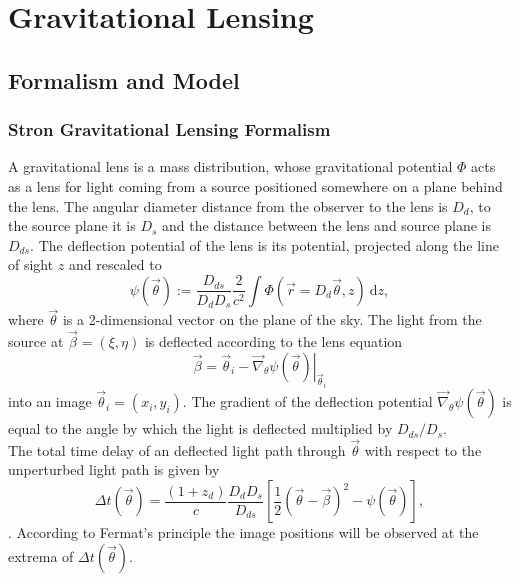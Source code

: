 \documentclass[useAMS,usenatbib]{mn2e}
\begin{document}
\clearpage

\section{Gravitational Lensing}

\subsection{Formalism and Model}

\subsubsection{Stron Gravitational Lensing Formalism}

A gravitational lens is a mass distribution, whose gravitational potential $\Phi$ acts as a lens for light coming from a source positioned somewhere on a plane behind the lens. The angular diameter distance from the observer to the lens is $D_d$, to the source plane it is $D_s$ and the distance between the lens and source plane is $D_{ds}$. The deflection potential of the lens is its potential, projected along the line of sight $z$ and rescaled to
\begin{equation}
\psi(\vec{\theta}) := \frac{D_{ds}}{D_d D_s} \frac{2}{c^2} \int \Phi(\vec{r}=D_d \vec{\theta},z) {\ \mathrm d} z, \label{eq:psidef}
\end{equation}
where $\vec{\theta}$ is a 2-dimensional vector on the plane of the sky. The light from the source at $\vec{\beta} = (\xi,\eta)$ is deflected according to the lens equation
\begin{equation}
\vec{\beta} = \vec{\theta}_i - \left.\vec{\nabla}_\theta \psi(\vec{\theta})\right|_{\vec{\theta}_i} \label{eq:lenseqpot}
\end{equation}
into an image $\vec{\theta}_i = (x_i,y_i)$. The gradient of the deflection potential $\vec{\nabla}_\theta \psi(\vec{\theta})$ is equal to the angle by which the light is deflected multiplied by $D_{ds}/D_{s}$.
\\The total time delay of an deflected light path through $\vec{\theta}$ with respect to the unperturbed light path is given by 
\begin{equation}
\Delta t(\vec{\theta}) = \frac{(1+z_d)}{c} \frac{D_d D_s}{D_{ds}} \left[ \frac 12 (\vec{\theta} - \vec{\beta})^2 - \psi(\vec{\theta})\right], \label{eq:timedelay}
\end{equation}
\citep{BartGravLens}. According to Fermat's principle the image positions will be observed at the extrema of $\Delta t(\vec{\theta})$.
\end{document}
